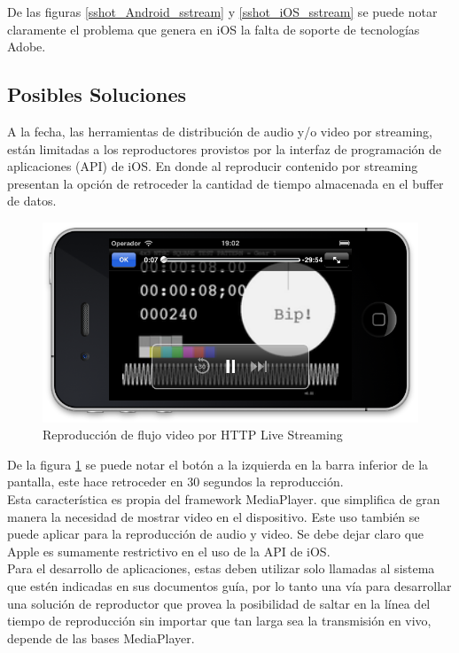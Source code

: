 	De las figuras \ref{sshot_Android_sstream} y \ref{sshot_iOS_sstream} se puede notar claramente el problema que genera en iOS la falta de soporte de tecnologías Adobe.

\newpage
\subsection{Posibles Soluciones}

A la fecha, las herramientas de distribución de audio y/o video por streaming, están limitadas a los reproductores provistos por la interfaz de programación de aplicaciones (API) de iOS. En donde al reproducir contenido por streaming presentan la opción de retroceder la cantidad de  tiempo almacenada en el buffer de datos. \\

\begin{figure}[h!]
	\includegraphics[scale=0.55]{imgs/sshot_iOS_hls.png}
	\caption{Reproducción de flujo video por HTTP Live Streaming}
	\label{sshot_iOS_hls}
\end{figure}

De la figura \ref{sshot_iOS_hls} se puede notar el botón a la izquierda en la barra inferior de  la pantalla, este hace retroceder en 30 segundos la reproducción.\\

Esta característica es propia del framework MediaPlayer. que simplifica de gran manera la necesidad de mostrar video en el dispositivo. Este uso también se puede aplicar para la reproducción  de  audio y video.
Se debe dejar claro que Apple es sumamente restrictivo en el uso de la API de iOS. \\
Para el desarrollo de aplicaciones, estas deben utilizar solo llamadas al sistema que estén indicadas en sus documentos guía, por lo tanto una vía para desarrollar una solución de reproductor que provea la posibilidad de saltar en la línea del tiempo de reproducción sin importar que tan larga sea la transmisión en vivo, depende de las bases MediaPlayer. \\

